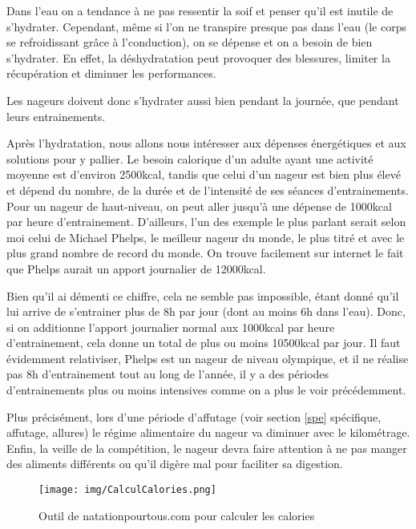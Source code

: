 \vspace{12pt}

Dans l'eau on a tendance à ne pas ressentir la soif et penser qu'il est inutile de s'hydrater. Cependant, même si l'on ne transpire presque pas dans l'eau (le corps se refroidissant grâce à l'\gls{conduction}), on se dépense et on a besoin de bien s'hydrater. En effet, la déshydratation peut provoquer des blessures, limiter la récupération et diminuer les performances.

Les nageurs doivent donc s'hydrater aussi bien pendant la journée, que pendant leurs entrainements.

\vspace{12pt}

Après l'hydratation, nous allons nous intéresser aux dépenses énergétiques et aux solutions pour y pallier. Le besoin calorique d'un adulte ayant une activité moyenne est d'environ 2500kcal, tandis que celui d'un nageur est bien plus élevé et dépend du nombre, de la durée et de l'intensité de ses séances d'entrainements. Pour un nageur de haut-niveau, on peut aller jusqu'à une dépense de 1000kcal par heure d'entrainement. D'ailleurs, l'un des exemple le plus parlant serait selon moi celui de Michael Phelps, le meilleur nageur du monde, le plus titré et avec le plus grand nombre de record du monde. On trouve facilement sur internet le fait que Phelps aurait un apport journalier de 12000kcal.

\vspace{12pt}

Bien qu'il ai démenti ce chiffre, cela ne semble pas impossible, étant donné qu'il lui arrive de s'entrainer plus de 8h par jour (dont au moins 6h dans l'eau). Donc, si on additionne l'apport journalier normal aux 1000kcal par heure d'entrainement, cela donne un total de plus ou moins 10500kcal par jour. Il faut évidemment relativiser, Phelps est un nageur de niveau olympique, et il ne réalise pas 8h d'entrainement tout au long de l'année, il y a des périodes d'entrainements plus ou moins intensives comme on a plus le voir précédemment.

Plus précisément, lors d'une période d'affutage (voir section \ref{spe} spécifique, affutage, allures) le régime alimentaire du nageur va diminuer avec le kilométrage. Enfin, la veille de la compétition, le nageur devra faire attention à ne pas manger des aliments différents ou qu'il digère mal pour faciliter sa digestion.

\begin{figure}[h]
\begin{center}
 \texttt{[image: img/CalculCalories.png]}
 \end{center}
 \caption{Outil de natationpourtous.com pour calculer les calories}
 \label{Outil de natationpourtous.com pour calculer les calories}
\end{figure}

